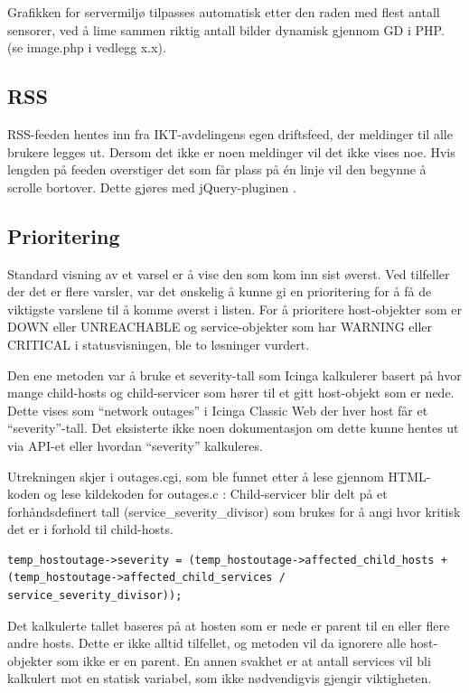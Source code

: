 Grafikken for servermiljø tilpasses automatisk etter den raden med flest antall sensorer, ved å lime sammen riktig antall bilder dynamisk gjennom GD i PHP. (se image.php i vedlegg x.x).

\subsection{RSS}

RSS-feeden hentes inn fra IKT-avdelingens egen driftsfeed, der meldinger til alle brukere legges ut. Dersom det ikke er noen meldinger vil det ikke vises noe. Hvis lengden på feeden overstiger det som får plass på én linje vil den begynne å scrolle bortover. Dette gjøres med jQuery-pluginen \cite{jqmarquee}.

\subsection{Prioritering}

Standard visning av et varsel er å vise den som kom inn sist øverst. Ved tilfeller der det er flere varsler, var det ønskelig å kunne gi en prioritering for å få de viktigste varslene til å komme øverst i listen. For å prioritere host-objekter som er DOWN eller UNREACHABLE og service-objekter som har WARNING eller CRITICAL i statusvisningen, ble to løsninger vurdert. 

Den ene metoden var å bruke et severity-tall som Icinga kalkulerer basert på hvor mange child-hosts og child-servicer som hører til et gitt host-objekt som er nede. Dette vises som “network outages” i Icinga Classic Web der hver host får et “severity”-tall. Det eksisterte ikke noen dokumentasjon om dette kunne hentes ut via API-et eller hvordan “severity” kalkuleres. 

Utrekningen skjer i outages.cgi, som ble funnet etter å lese gjennom HTML-koden og lese kildekoden for outages.c \cite{dnsmichi} : 
Child-servicer blir delt på et forhåndsdefinert tall (service\_severity\_divisor) som brukes for å angi hvor kritisk det er i forhold til child-hosts.

\begin{lstlisting}
temp_hostoutage->severity = (temp_hostoutage->affected_child_hosts + (temp_hostoutage->affected_child_services / service_severity_divisor));
\end{lstlisting}

Det kalkulerte tallet baseres på at hosten som er nede er parent til en eller flere andre hosts. Dette er ikke alltid tilfellet, og metoden vil da ignorere alle host-objekter som ikke er en parent. En annen svakhet er at antall services vil bli kalkulert mot en statisk variabel, som ikke nødvendigvis gjengir viktigheten.

